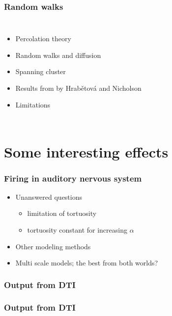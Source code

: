 \documentclass{beamer}
\begin{document}
\begin{frame}
 \frametitle{Random walks}
 \begin{columns}
  \column{2.0in}
  \begin{itemize}
   \item Percolation theory
   \item Random walks and diffusion
   \item Spanning cluster
   \item Results from by Hrab\v{e}tov\'{a} and Nicholson
   \item Limitations
  \end{itemize}
\column{2.0in}

 \end{columns}
\end{frame}

\section{Some interesting effects}
\begin{frame}
 \frametitle{Firing in auditory nervous system}
  \begin{itemize}
   \item Unanswered questions 
   \begin{itemize}
    \item limitation of tortuosity
    \item tortuosity constant for increasing $\alpha$
   \end{itemize}
   \item Other modeling methods
   \item Multi scale models; the best from both worlds?
  \end{itemize}
% 
\end{frame}


\begin{frame}
\frametitle{Output from DTI}
\end{frame}

\begin{frame}
\frametitle{Output from DTI}
\end{frame}
\end{document}
